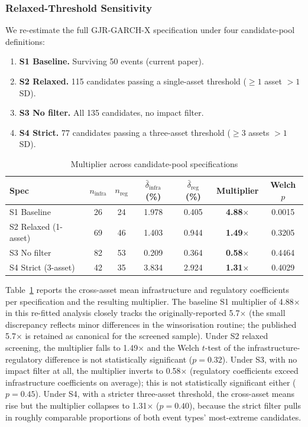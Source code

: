 \documentclass[pdflatex,sn-mathphys-num]{sn-jnl}
\theoremstyle{thmstyleone}
\theoremstyle{thmstyletwo}
\theoremstyle{thmstylethree}
\begin{document}
\subsubsection{Relaxed-Threshold Sensitivity}

We re-estimate the full GJR-GARCH-X specification under four candidate-pool definitions:
\begin{enumerate}[nosep]
\item \textbf{S1 Baseline.} Surviving 50 events (current paper).
\item \textbf{S2 Relaxed.} 115 candidates passing a single-asset threshold ($\geq 1$ asset $> 1$ SD).
\item \textbf{S3 No filter.} All 135 candidates, no impact filter.
\item \textbf{S4 Strict.} 77 candidates passing a three-asset threshold ($\geq 3$ assets $> 1$ SD).
\end{enumerate}

\begin{table}[htbp]
\centering
\caption{Multiplier across candidate-pool specifications}\label{tab:multiplier_sensitivity}
\small
\begin{tabular}{@{}lcccccc@{}}
\toprule
\textbf{Spec} & \textbf{$n_{\text{infra}}$} & \textbf{$n_{\text{reg}}$} & \textbf{$\bar{\delta}_{\text{infra}}$ (\%)} & \textbf{$\bar{\delta}_{\text{reg}}$ (\%)} & \textbf{Multiplier} & \textbf{Welch $p$} \\
\midrule
S1 Baseline       & 26 & 24 & 1.978 & 0.405 & \textbf{4.88$\times$} & 0.0015 \\
S2 Relaxed (1-asset)  & 69 & 46 & 1.403 & 0.944 & \textbf{1.49$\times$} & 0.3205 \\
S3 No filter      & 82 & 53 & 0.209 & 0.364 & \textbf{0.58$\times$} & 0.4464 \\
S4 Strict (3-asset)   & 42 & 35 & 3.834 & 2.924 & \textbf{1.31$\times$} & 0.4029 \\
\bottomrule
\end{tabular}
\end{table}

Table~\ref{tab:multiplier_sensitivity} reports the cross-asset mean infrastructure and regulatory coefficients per specification and the resulting multiplier. The baseline S1 multiplier of 4.88$\times$ in this re-fitted analysis closely tracks the originally-reported 5.7$\times$ (the small discrepancy reflects minor differences in the winsorisation routine; the published 5.7$\times$ is retained as canonical for the screened sample). Under S2 relaxed screening, the multiplier falls to 1.49$\times$ and the Welch $t$-test of the infrastructure-regulatory difference is not statistically significant ($p = 0.32$). Under S3, with no impact filter at all, the multiplier inverts to 0.58$\times$ (regulatory coefficients exceed infrastructure coefficients on average); this is not statistically significant either ($p = 0.45$). Under S4, with a stricter three-asset threshold, the cross-asset means rise but the multiplier collapses to 1.31$\times$ ($p = 0.40$), because the strict filter pulls in roughly comparable proportions of both event types' most-extreme candidates.
\end{document}
